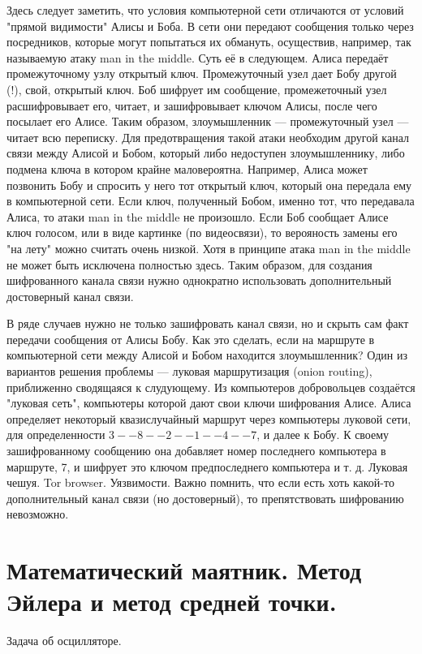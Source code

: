 \documentclass{book}
\begin{document}
Здесь следует заметить, что условия компьютерной сети отличаются от условий "прямой видимости"
Алисы и Боба. В сети они передают сообщения только через посредников, которые могут попытаться их
обмануть, осуществив, например, так называемую атаку man in the middle. Суть её в следующем. Алиса
передаёт промежуточному узлу открытый ключ. Промежуточный узел дает Бобу другой (!), свой, открытый
ключ. Боб шифрует им сообщение, промежеточный узел расшифровывает его, читает, и зашифровывает
ключом Алисы, после чего посылает его Алисе. Таким образом, злоумышленник --- промежуточный узел
--- читает всю переписку. Для предотвращения такой атаки необходим другой канал связи между Алисой
и Бобом, который либо недоступен злоумышленнику, либо подмена ключа в котором крайне маловероятна.
Например, Алиса может позвонить Бобу и спросить у него тот открытый ключ, который она передала ему
в компьютерной сети. Если ключ, полученный Бобом, именно тот, что передавала Алиса, то атаки man in
the middle не произошло. Если Боб сообщает Алисе ключ голосом, или в виде картинке (по видеосвязи),
то верояность замены его "на лету" можно считать очень низкой. Хотя в принципе атака man in the
middle не может быть исключена полностью здесь. Таким образом, для создания шифрованного канала
связи нужно однократно использовать дополнительный достоверный канал связи.

В ряде случаев нужно не только зашифровать канал связи, но и скрыть сам факт передачи сообщения от
Алисы Бобу. Как это сделать, если на маршруте в компьютерной сети между Алисой и Бобом находится
злоумышленник? Один из вариантов решения проблемы --- луковая маршрутизация (onion routing),
приближенно сводящаяся к слудующему. Из компьютеров добровольцев создаётся "луковая сеть",
компьютеры которой дают свои ключи шифрования Алисе. Алиса определяет некоторый квазислучайный
маршрут через компьютеры луковой сети, для определенности $3--8--2--1--4--7$, и далее к Бобу. К
своему зашифрованному сообщению она добавляет номер последнего компьютера в маршруте, 7, и шифрует
это ключом предпоследнего компьютера и т. д. Луковая чешуя. Tor browser. Уязвимости. Важно помнить,
что если есть хоть какой-то дополнительный канал связи (но достоверный), то препятствовать
шифрованию невозможно.

\section{Математический маятник. Метод Эйлера и метод средней точки.}

Задача об осцилляторе.
\end{document}
